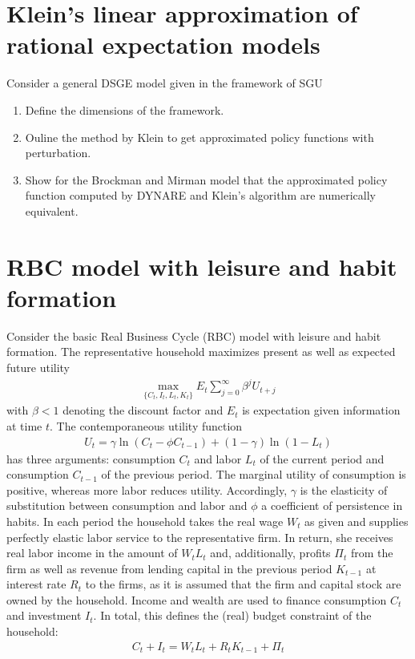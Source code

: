 \documentclass[a4paper]{scrartcl}
\begin{document}
\section{Klein's linear approximation of rational expectation models}
Consider a general DSGE model given in the framework of SGU
\begin{enumerate}
	\item Define the dimensions of the framework.
	\item Ouline the method by Klein to get approximated policy functions with perturbation.
	\item Show for the Brockman and Mirman model that the approximated policy function computed by DYNARE and Klein's algorithm are numerically equivalent.
\end{enumerate}
\newpage
\section{RBC model with leisure and habit formation}
Consider the basic Real Business Cycle (RBC) model with leisure and habit formation. The representative household maximizes present as well as expected future utility
\begin{align*}
\underset{\{C_{t},I_{t},L_t,K_{t}\}}{\max} E_t \sum_{j=0}^{\infty} \beta^{j} U_{t+j}
\end{align*}
with $\beta <1$ denoting the discount factor and $E_t$ is expectation given information at time $t$. The contemporaneous utility function 
\begin{align*}
U_t = \gamma \ln(C_t - \phi C_{t-1}) + (1-\gamma) \ln{(1-L_t)}
\end{align*}
has three arguments: consumption $C_t$ and labor $L_t$ of the current period and consumption $C_{t-1}$ of the previous period. The marginal utility of consumption is positive, whereas more labor reduces utility. Accordingly, $\gamma$ is the elasticity of substitution between consumption and labor and $\phi$ a coefficient of persistence in habits. In each period the household takes the real wage $W_t$ as given and supplies perfectly elastic labor service to the representative firm. In return, she receives real labor income in the amount of $W_t L_t$ and, additionally, profits $\Pi_t$ from the firm as well as revenue from lending capital in the previous period $K_{t-1}$ at interest rate $R_t$ to the firms, as it is assumed that the firm and capital stock are owned by the household. Income and wealth are used to finance consumption $C_t$ and investment $I_t$. In total, this defines the (real) budget constraint of the household:
\begin{align*}
C_t + I_t = W_t L_t + R_t K_{t-1} + \Pi_t
\end{align*}
\end{document}
